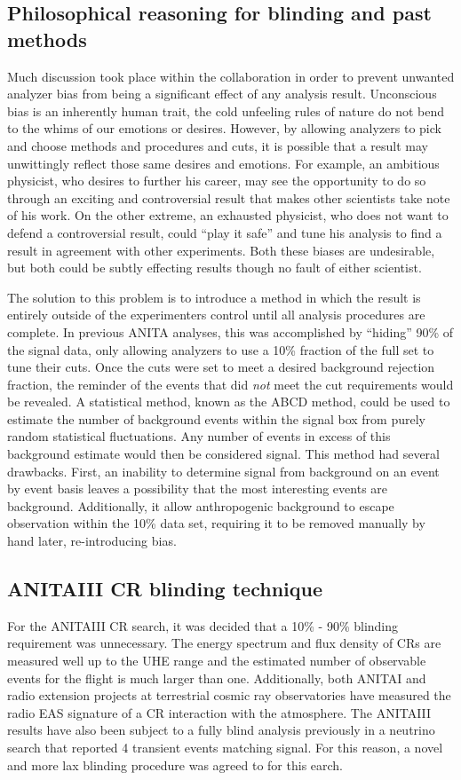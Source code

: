 	\subsection{Philosophical reasoning for blinding and past methods}
		Much discussion took place within the collaboration in order to prevent unwanted analyzer bias from being a significant effect of any analysis result.  Unconscious bias is an inherently human trait, the cold unfeeling rules of nature do not bend to the whims of our emotions or desires.  However, by allowing analyzers to pick and choose methods and procedures and cuts, it is possible that a result may unwittingly reflect those same desires and emotions.  For example, an ambitious physicist, who desires to further his career, may see the opportunity to do so through an exciting and controversial result that makes other scientists take note of his work.  On the other extreme, an exhausted physicist, who does not want to defend a controversial result, could ``play it safe'' and tune his analysis to find a result in agreement with other experiments.  Both these biases are undesirable, but both could be subtly effecting results though no fault of either scientist.
		
		The solution to this problem is to introduce a method in which the result is entirely outside of the experimenters control until all analysis procedures are complete.  In previous ANITA analyses, this was accomplished by ``hiding'' 90\% of the signal data, only allowing analyzers to use a 10\% fraction of the full set to tune their cuts.  Once the cuts were set to meet a desired background rejection fraction, the reminder of the events that did \textit{not} meet the cut requirements would be revealed.  A statistical method, known as the ABCD method, could be used to estimate the number of background events within the signal box from purely random statistical fluctuations.  Any number of events in excess of this background estimate would then be considered signal.  This method had several drawbacks. First, an inability to determine signal from background on an event by event basis leaves a possibility that the most interesting events are background.  Additionally, it allow anthropogenic background to escape observation within the 10\% data set, requiring it to be removed manually by hand later, re-introducing bias.
		
	\subsection{ANITAIII CR blinding technique}
		For the ANITAIII CR search, it was decided that a 10\% - 90\% blinding requirement was unnecessary.  The energy spectrum and flux density of CRs are measured well up to the UHE range and the estimated number of observable events for the flight is much larger than one.  Additionally, both ANITAI and radio extension projects at terrestrial cosmic ray observatories have measured the radio EAS signature of a CR interaction with the atmosphere.  The ANITAIII results have also been subject to a fully blind analysis previously in a neutrino search that reported 4 transient events matching signal.  For this reason, a novel and more lax blinding procedure was agreed to for this earch.

